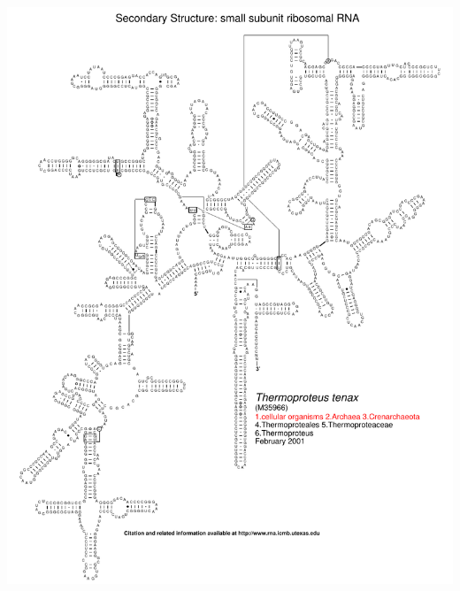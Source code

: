 \documentclass[landscape]{slides}
\begin{document}
\begin{slide}\begin{center}\includegraphics[height=8in]{figs/arc-25}\end{center}\vfill\end{slide}
\end{document}
